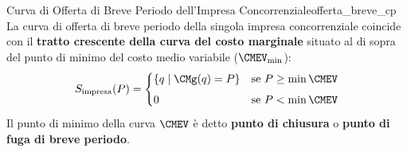 \begin{teorema}{Curva di Offerta di Breve Periodo dell'Impresa Concorrenziale}{offerta_breve_cp}
La curva di offerta di breve periodo della singola impresa concorrenziale coincide con il \textbf{tratto crescente della curva del costo marginale} situato al di sopra del punto di minimo del costo medio variabile ($\CMEV_{\min}$):
\begin{equation}
    S_{\text{impresa}}(P) = \begin{cases}
        \{ q \mid \CMg(q) = P \} & \text{se } P \ge \min \CMEV \\[1ex]
        0 & \text{se } P < \min \CMEV
    \end{cases}
\end{equation}
Il punto di minimo della curva $\CMEV$ è detto \textbf{punto di chiusura} o \textbf{punto di fuga di breve periodo}.
\end{teorema}

